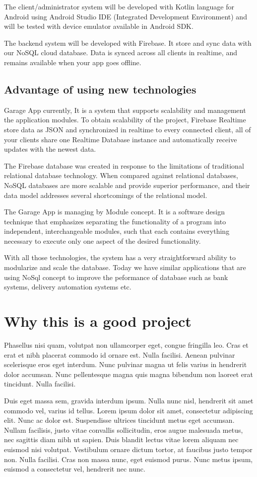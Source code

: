 The client/administrator system will be developed with Kotlin language for Android using Android Studio IDE (Integrated Development Environment) and will be tested with device emulator available in Android SDK.

The backend system will be developed with Firebase. It store and sync data with our NoSQL cloud database. Data is synced across all clients in realtime, and remains available when your app goes offline.

\subsection{Advantage of using new technologies}

Garage App currently, It is a system that supports scalability and management the application modules. To obtain scalability of the project, Firebase Realtime \citep{Reference1} store data as JSON and synchronized in realtime to every connected client, all of your clients share one Realtime Database instance and automatically receive updates with the newest data.

The Firebase database was created in response to the limitations of traditional relational database technology. When compared against relational databases, NoSQL \citep{Reference2}  databases are more scalable and provide superior performance, and their data model addresses several shortcomings of the relational model.

The Garage App is managing by Module concept. It is a software design technique that emphasizes separating the functionality of a program into independent, interchangeable modules, such that each contains everything necessary to execute only one aspect of the desired functionality.

With all those technologies, the system has a very straightforward ability to modularize and scale the database. Today we have similar applications that are using NoSql concept to improve the peformance of database such as bank systems, delivery automation systems etc. 

\section{Why this is a good project}

Phasellus nisi quam, volutpat non ullamcorper eget, congue fringilla leo. Cras et erat et nibh placerat commodo id ornare est. Nulla facilisi. Aenean pulvinar scelerisque eros eget interdum. Nunc pulvinar magna ut felis varius in hendrerit dolor accumsan. Nunc pellentesque magna quis magna bibendum non laoreet erat tincidunt. Nulla facilisi.

Duis eget massa sem, gravida interdum ipsum. Nulla nunc nisl, hendrerit sit amet commodo vel, varius id tellus. Lorem ipsum dolor sit amet, consectetur adipiscing elit. Nunc ac dolor est. Suspendisse ultrices tincidunt metus eget accumsan. Nullam facilisis, justo vitae convallis sollicitudin, eros augue malesuada metus, nec sagittis diam nibh ut sapien. Duis blandit lectus vitae lorem aliquam nec euismod nisi volutpat. Vestibulum ornare dictum tortor, at faucibus justo tempor non. Nulla facilisi. Cras non massa nunc, eget euismod purus. Nunc metus ipsum, euismod a consectetur vel, hendrerit nec nunc.